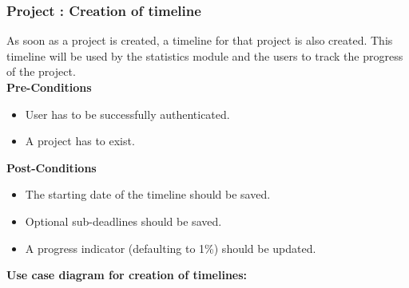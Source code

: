 \subsubsection{Project : Creation of timeline}
	As soon as a project is created, a timeline for that project is also created. This timeline will be used by the statistics module and the users to track the progress of the project.\\
\textbf{Pre-Conditions}
\begin{itemize}
	\item User has to be successfully authenticated.
	\item A project has to exist. 
\end{itemize}
\textbf{Post-Conditions}
\begin{itemize}
	\item The starting date of the timeline should be saved.
	\item Optional sub-deadlines should be saved.
	\item A progress indicator (defaulting to 1\%) should be updated.
\end{itemize}
\textbf{Use case diagram for creation of timelines: }\\
\centerline{}	
	
